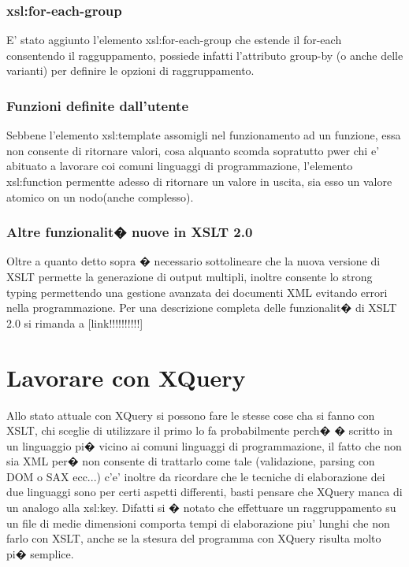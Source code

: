 \documentclass[11pt,titlepage,a4paper,twoside,openany]{book}
\begin{document}
\subsection{xsl:for-each-group}
E' stato aggiunto l'elemento xsl:for-each-group che estende il for-each consentendo il ragguppamento, possiede infatti l'attributo group-by (o anche delle varianti) per definire le opzioni di raggruppamento.
\subsection{Funzioni definite dall'utente}
Sebbene l'elemento xsl:template assomigli nel funzionamento ad un funzione, essa non consente di ritornare valori, cosa alquanto scomda sopratutto pwer chi e' abituato a lavorare coi comuni linguaggi di programmazione, l'elemento xsl:function permentte adesso di ritornare un valore in uscita, sia esso un valore atomico on un nodo(anche complesso).
\subsection{Altre funzionalit� nuove in XSLT 2.0}
Oltre a quanto detto sopra � necessario sottolineare che la nuova versione di XSLT permette la generazione di output multipli, inoltre consente lo strong typing permettendo una gestione avanzata dei documenti XML evitando errori nella programmazione. Per una descrizione completa delle funzionalit� di XSLT 2.0 si rimanda a [link!!!!!!!!!!]

\chapter{Lavorare con XQuery}
Allo stato attuale con XQuery si possono fare le stesse cose cha si fanno con XSLT, chi sceglie di utilizzare il primo lo fa probabilmente perch� � scritto in un linguaggio pi� vicino ai comuni linguaggi di programmazione, il fatto che non sia XML per� non consente di trattarlo come tale (validazione, parsing con DOM o SAX ecc...) c'e' inoltre da ricordare che le tecniche di elaborazione dei due linguaggi sono per certi aspetti differenti, basti pensare che XQuery manca di un analogo alla xsl:key.
Difatti si � notato che effettuare un raggruppamento su un file di medie dimensioni comporta tempi di elaborazione piu' lunghi che non farlo con XSLT, anche se la stesura del programma con XQuery risulta molto pi� semplice.
\end{document}
